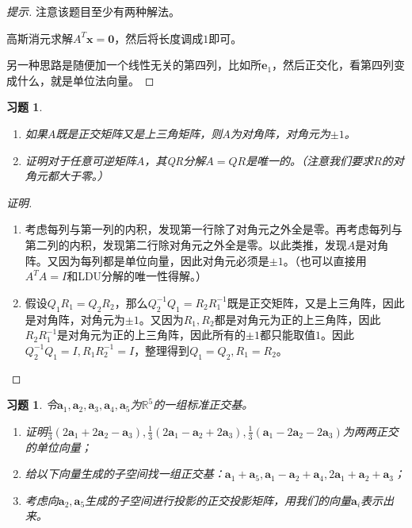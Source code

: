 \documentclass[UTF8]{ctexart}
\newtheorem{ex}[thm]{习题}
\begin{document}
\begin{proof}[提示]
注意该题目至少有两种解法。

高斯消元求解$A^T\bm x=\bm 0$，然后将长度调成$1$即可。

另一种思路是随便加一个线性无关的第四列，比如所$\bm e_1$，然后正交化，看第四列变成什么，就是单位法向量。
\end{proof}


\begin{ex}

\begin{enumerate}
\item 如果$A$既是正交矩阵又是上三角矩阵，则$A$为对角阵，对角元为$\pm 1$。
\item 证明对于任意可逆矩阵$A$，其QR分解$A=QR$是唯一的。（注意我们要求$R$的对角元都大于零。）
\end{enumerate}
\end{ex}

\begin{proof}[证明]
\begin{enumerate}
\item 考虑每列与第一列的内积，发现第一行除了对角元之外全是零。再考虑每列与第二列的内积，发现第二行除对角元之外全是零。以此类推，发现$A$是对角阵。又因为每列都是单位向量，因此对角元必须是$\pm 1$。（也可以直接用$A^TA=I$和LDU分解的唯一性得解。）
\item 假设$Q_1R_1=Q_2R_2$，那么$Q_2^{-1}Q_1=R_2R_1^{-1}$既是正交矩阵，又是上三角阵，因此是对角阵，对角元为$\pm 1$。又因为$R_1,R_2$都是对角元为正的上三角阵，因此$R_2R_1^{-1}$是对角元为正的上三角阵，因此所有的$\pm 1$都只能取值$1$。因此$Q_2^{-1}Q_1=I,R_1R_2^{-1}=I$，整理得到$Q_1=Q_2,R_1=R_2$。
\end{enumerate}
\end{proof}

\begin{ex}
令$\bm a_1,\bm a_2,\bm a_3,\bm a_4,\bm a_5$为$\mathbb{R}^5$的一组标准正交基。
\begin{enumerate}
\item 证明$\frac{1}{3}(2\bm a_1+2\bm a_2-\bm a_3),\frac{1}{3}(2\bm a_1-\bm a_2+2\bm a_3),\frac{1}{3}(\bm a_1-2\bm a_2-2\bm a_3)$为两两正交的单位向量；
\item 给以下向量生成的子空间找一组正交基：$\bm a_1+\bm a_5, \bm a_1-\bm a_2+\bm a_4, 2\bm a_1+\bm a_2+\bm a_3$；
\item 考虑向$\bm a_2,\bm a_5$生成的子空间进行投影的正交投影矩阵，用我们的向量$\bm a_i$表示出来。
\end{enumerate}
\end{ex}
\end{document}
